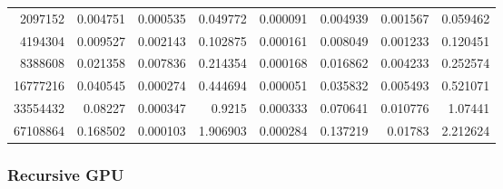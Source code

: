 \begin{tabular}{r r r r r r r r}
2097152 & 0.004751 & 0.000535 & 0.049772 & 0.000091 & 0.004939 & 0.001567 & 0.059462 \\
4194304 & 0.009527 & 0.002143 & 0.102875 & 0.000161 & 0.008049 & 0.001233 & 0.120451 \\
8388608 & 0.021358 & 0.007836 & 0.214354 & 0.000168 & 0.016862 & 0.004233 & 0.252574 \\
16777216 & 0.040545 & 0.000274 & 0.444694 & 0.000051 & 0.035832 & 0.005493 & 0.521071 \\
33554432 & 0.08227 & 0.000347 & 0.9215 & 0.000333 & 0.070641 & 0.010776 & 1.07441 \\
67108864 & 0.168502 & 0.000103 & 1.906903 & 0.000284 & 0.137219 & 0.01783 & 2.212624 \\
\end{tabular}

\subsubsection{Recursive GPU}

